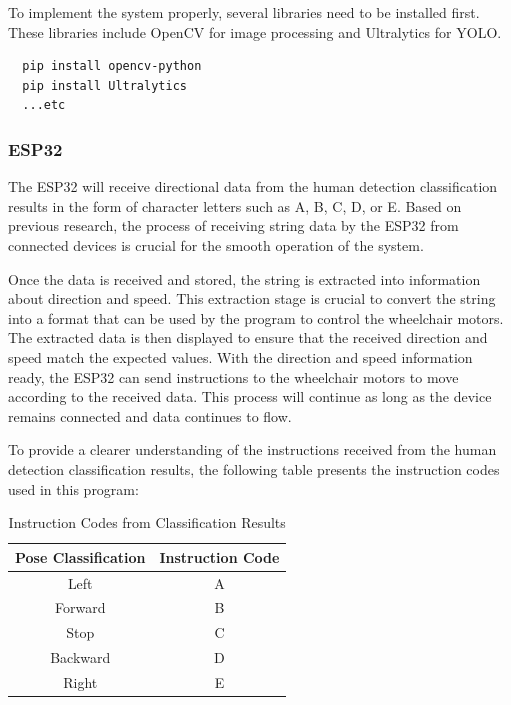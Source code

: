 To implement the system properly, several libraries need to be installed first. These libraries include OpenCV for image processing and Ultralytics for YOLO.

\begin{lstlisting}
  pip install opencv-python
  pip install Ultralytics
  ...etc
\end{lstlisting}

\vspace{5pt}
\subsubsection{ESP32}
\label{subsubsec:ESP32}

The ESP32 will receive directional data from the human detection classification results in the form of character letters such as A, B, C, D, or E. Based on previous research, the process of receiving string data by the ESP32 from connected devices is crucial for the smooth operation of the system.

Once the data is received and stored, the string is extracted into information about direction and speed. This extraction stage is crucial to convert the string into a format that can be used by the program to control the wheelchair motors. The extracted data is then displayed to ensure that the received direction and speed match the expected values. With the direction and speed information ready, the ESP32 can send instructions to the wheelchair motors to move according to the received data. This process will continue as long as the device remains connected and data continues to flow.

To provide a clearer understanding of the instructions received from the human detection classification results, the following table presents the instruction codes used in this program:

\begin{table}[H]
\centering
\caption{Instruction Codes from Classification Results}
\begin{tabular}{|c|c|}
\hline
\textbf{Pose Classification} & \textbf{Instruction Code} \\
\hline
Left & A \\
\hline
Forward & B \\
\hline
Stop & C \\
\hline
Backward & D \\
\hline
Right & E \\
\hline
\end{tabular}
\end{table}

